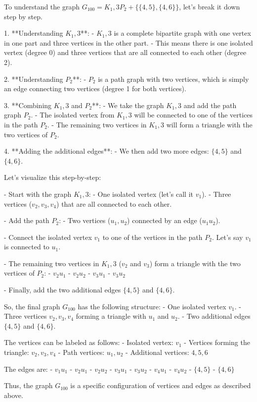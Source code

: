 To understand the graph \( G_{100} = K_1,3 P_2 + \{\{4,5\},\{4,6\}\} \), let's break it down step by step.

1. **Understanding \( K_1,3 \)**:
   - \( K_1,3 \) is a complete bipartite graph with one vertex in one part and three vertices in the other part.
   - This means there is one isolated vertex (degree 0) and three vertices that are all connected to each other (degree 2).

2. **Understanding \( P_2 \)**:
   - \( P_2 \) is a path graph with two vertices, which is simply an edge connecting two vertices (degree 1 for both vertices).

3. **Combining \( K_1,3 \) and \( P_2 \)**:
   - We take the graph \( K_1,3 \) and add the path graph \( P_2 \).
   - The isolated vertex from \( K_1,3 \) will be connected to one of the vertices in the path \( P_2 \).
   - The remaining two vertices in \( K_1,3 \) will form a triangle with the two vertices of \( P_2 \).

4. **Adding the additional edges**:
   - We then add two more edges: \(\{4,5\}\) and \(\{4,6\}\).

Let's visualize this step-by-step:

- Start with the graph \( K_1,3 \):
  - One isolated vertex (let's call it \( v_1 \)).
  - Three vertices (\( v_2, v_3, v_4 \)) that are all connected to each other.

- Add the path \( P_2 \):
  - Two vertices (\( u_1, u_2 \)) connected by an edge (\( u_1u_2 \)).

- Connect the isolated vertex \( v_1 \) to one of the vertices in the path \( P_2 \). Let's say \( v_1 \) is connected to \( u_1 \).

- The remaining two vertices in \( K_1,3 \) (\( v_2 \) and \( v_3 \)) form a triangle with the two vertices of \( P_2 \):
  - \( v_2u_1 \)
  - \( v_2u_2 \)
  - \( v_3u_1 \)
  - \( v_3u_2 \)

- Finally, add the two additional edges \(\{4,5\}\) and \(\{4,6\}\).

So, the final graph \( G_{100} \) has the following structure:
- One isolated vertex \( v_1 \).
- Three vertices \( v_2, v_3, v_4 \) forming a triangle with \( u_1 \) and \( u_2 \).
- Two additional edges \(\{4,5\}\) and \(\{4,6\}\).

The vertices can be labeled as follows:
- Isolated vertex: \( v_1 \)
- Vertices forming the triangle: \( v_2, v_3, v_4 \)
- Path vertices: \( u_1, u_2 \)
- Additional vertices: \( 4, 5, 6 \)

The edges are:
- \( v_1u_1 \)
- \( v_2u_1 \)
- \( v_2u_2 \)
- \( v_3u_1 \)
- \( v_3u_2 \)
- \( v_4u_1 \)
- \( v_4u_2 \)
- \( \{4,5\} \)
- \( \{4,6\} \)

Thus, the graph \( G_{100} \) is a specific configuration of vertices and edges as described above.